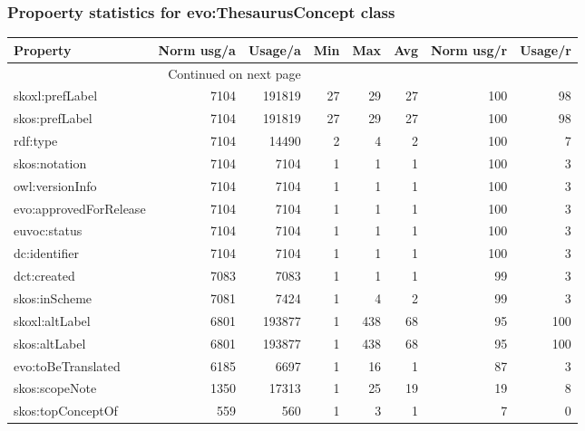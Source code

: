 \documentclass[10pt,a4paper,titlepage,final]{article}
\begin{document}
\subsubsection{Propoerty statistics for evo:ThesaurusConcept class}
\begin{longtable}{lrrrrrrr}
\toprule
               Property &  Norm usg/a &  Usage/a &  Min &  Max &  Avg &  Norm usg/r &  Usage/r \\
\midrule
\endhead
\midrule
\multicolumn{3}{r}{{Continued on next page}} \\
\midrule
\endfoot

\bottomrule
\endlastfoot
        skoxl:prefLabel &        7104 &   191819 &   27 &   29 &   27 &         100 &       98 \\
         skos:prefLabel &        7104 &   191819 &   27 &   29 &   27 &         100 &       98 \\
               rdf:type &        7104 &    14490 &    2 &    4 &    2 &         100 &        7 \\
          skos:notation &        7104 &     7104 &    1 &    1 &    1 &         100 &        3 \\
        owl:versionInfo &        7104 &     7104 &    1 &    1 &    1 &         100 &        3 \\
 evo:approvedForRelease &        7104 &     7104 &    1 &    1 &    1 &         100 &        3 \\
           euvoc:status &        7104 &     7104 &    1 &    1 &    1 &         100 &        3 \\
          dc:identifier &        7104 &     7104 &    1 &    1 &    1 &         100 &        3 \\
            dct:created &        7083 &     7083 &    1 &    1 &    1 &          99 &        3 \\
          skos:inScheme &        7081 &     7424 &    1 &    4 &    2 &          99 &        3 \\
         skoxl:altLabel &        6801 &   193877 &    1 &  438 &   68 &          95 &      100 \\
          skos:altLabel &        6801 &   193877 &    1 &  438 &   68 &          95 &      100 \\
     evo:toBeTranslated &        6185 &     6697 &    1 &   16 &    1 &          87 &        3 \\
         skos:scopeNote &        1350 &    17313 &    1 &   25 &   19 &          19 &        8 \\
      skos:topConceptOf &         559 &      560 &    1 &    3 &    1 &           7 &        0 \\

\end{longtable}
\end{document}
